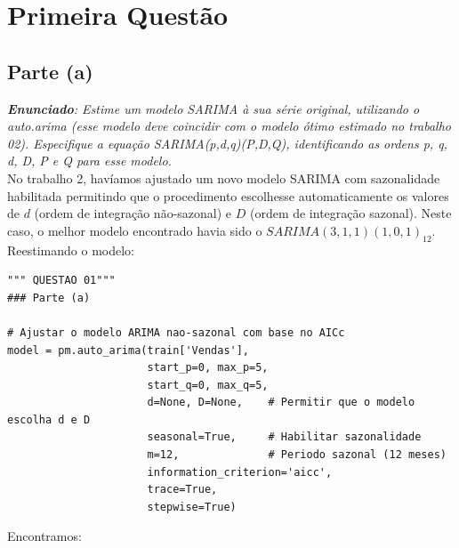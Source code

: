 \documentclass[a4paper, 12pt]{article}
\begin{document}
\newpage
\section{Primeira Questão}

\subsection{Parte (a)}
\textit{\textbf{Enunciado}: Estime um modelo SARIMA à sua série original, utilizando o auto.arima (esse modelo
deve coincidir com o modelo ótimo estimado no trabalho 02). Especifique a equação
SARIMA(p,d,q)(P,D,Q), identificando as ordens p, q, d, D, P e Q para esse modelo.}\\

No trabalho 2, havíamos ajustado um novo modelo SARIMA com sazonalidade habilitada permitindo que o procedimento escolhesse automaticamente os valores de $d$ (ordem de integração não-sazonal) e $D$ (ordem de integração sazonal). Neste caso, o melhor modelo encontrado havia sido o $SARIMA(3,1,1)(1,0,1)_{12}$. Reestimando o modelo:\\

\begin{lstlisting}[style=python]
    """ QUESTAO 01"""
### Parte (a)

# Ajustar o modelo ARIMA nao-sazonal com base no AICc
model = pm.auto_arima(train['Vendas'],
                      start_p=0, max_p=5,
                      start_q=0, max_q=5,
                      d=None, D=None,    # Permitir que o modelo escolha d e D
                      seasonal=True,     # Habilitar sazonalidade
                      m=12,              # Periodo sazonal (12 meses)
                      information_criterion='aicc',
                      trace=True,
                      stepwise=True)
\end{lstlisting}

Encontramos:\\
\end{document}
